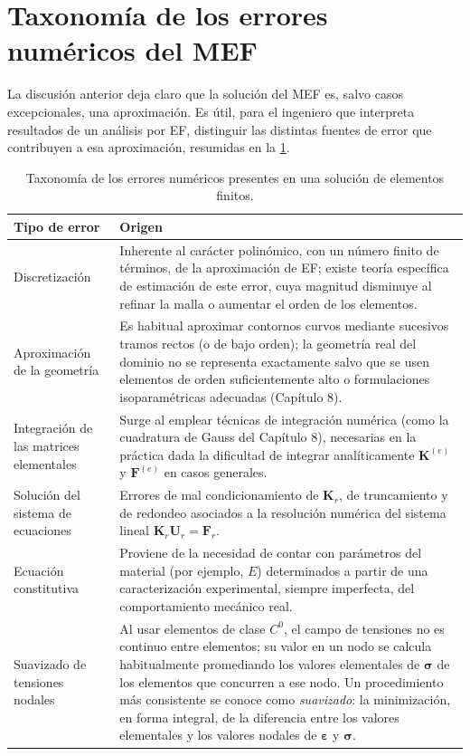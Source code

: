 \section{Taxonomía de los errores numéricos del MEF}

La discusión anterior deja claro que la solución del MEF es, salvo casos excepcionales, una aproximación. Es útil, para el ingeniero que interpreta resultados de un análisis por EF, distinguir las distintas fuentes de error que contribuyen a esa aproximación, resumidas en la \cref{tab:cap07-taxonomia-errores}.

\begin{table}[htbp]
\centering
\caption{Taxonomía de los errores numéricos presentes en una solución de elementos finitos.}
\label{tab:cap07-taxonomia-errores}
\begin{tabular}{@{}p{4.1cm}p{8.7cm}@{}}
\toprule
\textbf{Tipo de error} & \textbf{Origen} \\
\midrule
Discretización & Inherente al carácter polinómico, con un número finito de términos, de la aproximación de EF; existe teoría específica de estimación de este error, cuya magnitud disminuye al refinar la malla o aumentar el orden de los elementos. \\
Aproximación de la geometría & Es habitual aproximar contornos curvos mediante sucesivos tramos rectos (o de bajo orden); la geometría real del dominio no se representa exactamente salvo que se usen elementos de orden suficientemente alto o formulaciones isoparamétricas adecuadas (Capítulo 8). \\
Integración de las matrices elementales & Surge al emplear técnicas de integración numérica (como la cuadratura de Gauss del Capítulo 8), necesarias en la práctica dada la dificultad de integrar analíticamente $\bm K^{(e)}$ y $\bm F^{(e)}$ en casos generales. \\
Solución del sistema de ecuaciones & Errores de mal condicionamiento de $\bm K_r$, de truncamiento y de redondeo asociados a la resolución numérica del sistema lineal $\bm K_r\bm U_r=\bm F_r$. \\
Ecuación constitutiva & Proviene de la necesidad de contar con parámetros del material (por ejemplo, $E$) determinados a partir de una caracterización experimental, siempre imperfecta, del comportamiento mecánico real. \\
Suavizado de tensiones nodales & Al usar elementos de clase $C^0$, el campo de tensiones no es continuo entre elementos; su valor en un nodo se calcula habitualmente promediando los valores elementales de $\bm\sigma$ de los elementos que concurren a ese nodo. Un procedimiento más consistente se conoce como \emph{suavizado}: la minimización, en forma integral, de la diferencia entre los valores elementales y los valores nodales de $\bm\varepsilon$ y $\bm\sigma$. \\
\bottomrule
\end{tabular}
\end{table}

